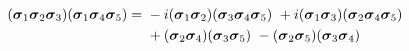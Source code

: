\documentclass{beamer}
\begin{document}
\begin{frame}
\begin{align}
  \\
  (\ssigma_1\ssigma_2\ssigma_3)(\ssigma_1\ssigma_4\ssigma_5) = & \
  -i(\ssigma_1 \ssigma_2)(\ssigma_3 \ssigma_4 \ssigma_5) \
  +i(\ssigma_1 \ssigma_3 )(\ssigma_2 \ssigma_4 \ssigma_5) \nonumber\\  & \
  +(\ssigma_2 \ssigma_4)(\ssigma_3 \ssigma_5)\
  -(\ssigma_2 \ssigma_5)(\ssigma_3 \ssigma_4) 		%
\end{align}
\normalsize

\end{frame}
\end{document}
